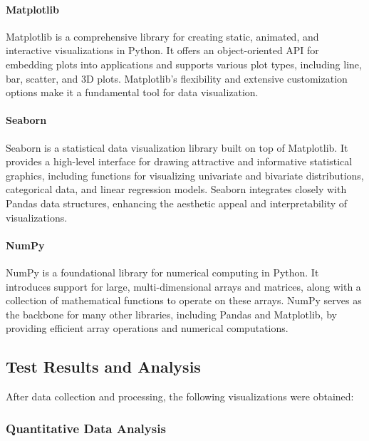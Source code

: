 \paragraph{Matplotlib}

Matplotlib is a comprehensive library for creating static, animated, and interactive visualizations in Python. It offers an object-oriented API for embedding plots into applications and supports various plot types, including line, bar, scatter, and 3D plots. Matplotlib's flexibility and extensive customization options make it a fundamental tool for data visualization.

\cite{matplotlib}

\paragraph{Seaborn}

Seaborn is a statistical data visualization library built on top of Matplotlib. It provides a high-level interface for drawing attractive and informative statistical graphics, including functions for visualizing univariate and bivariate distributions, categorical data, and linear regression models. Seaborn integrates closely with Pandas data structures, enhancing the aesthetic appeal and interpretability of visualizations.
\cite{sea-geg-intr}


\paragraph{NumPy}

NumPy is a foundational library for numerical computing in Python. It introduces support for large, multi-dimensional arrays and matrices, along with a collection of mathematical functions to operate on these arrays. NumPy serves as the backbone for many other libraries, including Pandas and Matplotlib, by providing efficient array operations and numerical computations.

\cite{numpy}

\subsection{Test Results and Analysis}

After data collection and processing, the following visualizations were obtained:

\subsubsection{Quantitative Data Analysis}

